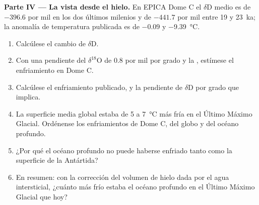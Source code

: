\begin{problem}
\medskip\noindent\textbf{Parte IV --- La vista desde el hielo.}
En EPICA Dome C el $\delta$D medio es de $-396.6$ por mil en los dos últimos milenios y de
$-441.7$ por mil entre 19 y \qty{23}{ka}; la anomalía de temperatura publicada es de $-0.09$ y
\qty{-9.39}{\celsius}.
\begin{enumerate}[resume]
  \item Calcúlese el cambio de $\delta$D.
  \item Con una pendiente del $\delta^{18}$O de \num{0.8} por mil por grado y la ,
        estímese el enfriamiento en Dome C.
  \item Calcúlese el enfriamiento publicado, y la pendiente de $\delta$D por grado que implica.
  \item La superficie media global estaba de 5 a \qty{7}{\celsius} más fría en el Último Máximo Glacial.
        Ordénense los enfriamientos de Dome C, del globo y del océano profundo.
  \item ¿Por qué el océano profundo no puede haberse enfriado tanto como la superficie de la Antártida?
  \item En resumen: con la corrección del volumen de hielo dada por el agua intersticial, ¿cuánto más frío estaba el océano profundo
        en el Último Máximo Glacial que hoy?
\end{enumerate}
\end{problem}
